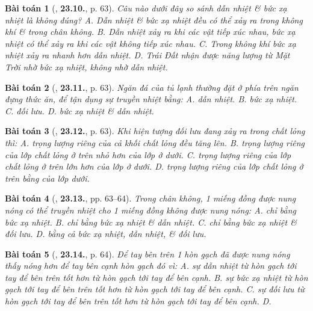 \documentclass{article}
\numberwithin{equation}{section}
\newtheorem{baitoan}{Bài toán}
\begin{document}
\begin{baitoan}[\cite{SBT_Vat_Ly_8}, \textbf{23.10.}, p. 63]
	Câu nào dưới đây so sánh dẫn nhiệt \& bức xạ nhiệt là không đúng? {\sf A.} Dẫn nhiệt \& bức xạ nhiệt đều có thể xảy ra trong không khí \& trong chân không. {\sf B.} Dẫn nhiệt xảy ra khi các vật tiếp xúc nhau, bức xạ nhiệt có thể xảy ra khi các vật không tiếp xúc nhau. {\sf C.} Trong không khí bức xạ nhiệt xảy ra nhanh hơn dẫn nhiệt. {\sf D.} Trái Đất nhận được năng lượng từ Mặt Trời nhờ bức xạ nhiệt, không nhờ dẫn nhiệt.
\end{baitoan}

\begin{baitoan}[\cite{SBT_Vat_Ly_8}, \textbf{23.11.}, p. 63]
	Ngăn đá của tủ lạnh thường đặt ở phía trên ngăn đựng thức ăn, để tận dụng sự truyền nhiệt bằng: {\sf A.} dẫn nhiệt. {\sf B.} bức xạ nhiệt. {\sf C.} đối lưu. {\sf D.} bức xạ nhiệt \& dẫn nhiệt.
\end{baitoan}

\begin{baitoan}[\cite{SBT_Vat_Ly_8}, \textbf{23.12.}, p. 63]
	Khi hiện tượng đối lưu đang xảy ra trong chất lỏng thì: {\sf A.} trọng lượng riêng của cả khối chất lỏng đều tăng lên. {\sf B.} trọng lượng riêng của lớp chất lỏng ở trên nhỏ hơn của lớp ở dưới. {\sf C.} trọng lượng riêng của lớp chất lỏng ở trên lớn hơn của lớp ở dưới. {\sf D.} trọng lượng riêng của lớp chất lỏng ở trên bằng của lớp dưới.
\end{baitoan}

\begin{baitoan}[\cite{SBT_Vat_Ly_8}, \textbf{23.13.}, pp. 63--64]
	Trong chân không, 1 miếng đồng được nung nóng có thể truyền nhiệt cho 1 miếng đồng không được nung nóng: {\sf A.} chỉ bằng bức xạ nhiệt. {\sf B.} chỉ bằng bức xạ nhiệt \& dẫn nhiệt. {\sf C.} chỉ bằng bức xạ nhiệt \& đối lưu. {\sf D.} bằng cả bức xạ nhiệt, dẫn nhiệt, \& đối lưu.
\end{baitoan}

\begin{baitoan}[\cite{SBT_Vat_Ly_8}, \textbf{23.14.}, p. 64]
	Để tay bên trên 1 hòn gạch đã được nung nóng thấy nóng hơn để tay bên cạnh hòn gạch đó vì: {\sf A.} sự dẫn nhiệt từ hòn gạch tới tay để bên trên tốt hơn từ hòn gạch tới tay để bên cạnh. {\sf B.} sự bức xạ nhiệt từ hòn gạch tới tay để bên trên tốt hơn từ hòn gạch tới tay để bên cạnh. {\sf C.} sự đối lưu từ hòn gạch tới tay để bên trên tốt hơn từ hòn gạch tới tay để bên cạnh. {\sf D.} 
\end{baitoan}
\end{document}
